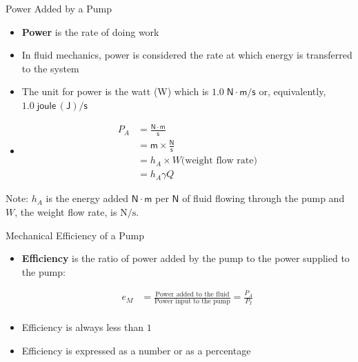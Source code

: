 \documentclass[9pt,xcolor={svgnames, x11names},professionalfonts, mathserif]{beamer}
\begin{document}

\begin{frame}{Power Added by a Pump}
	
	\begin{itemize}
		\item \textbf{Power} is the rate of doing work
		\item In fluid mechanics, power is considered the rate at which energy is transferred to the system
		\item The unit for power is the watt (W) which is $1.0\; \mathsf{N\!\cdot\! m/s}$ or, equivalently, $1.0\;
		      \mathsf{joule\,(J) /s}$
		\item[]\pause
		      
		      \begin{align*}
		      	P_A & = \mathsf{\frac{N\cdot m}{s}}          \\
		      	    & =  \mathsf{m\times \frac{N}{s}}        \\
		      	    & = h_A\times W\text{(weight flow rate)} \\
		      	    & = h_A\gamma Q                          
		      \end{align*}
	\end{itemize}
	Note: $h_A$ is the energy added $\mathsf{N\!\cdot\! m}$ per $\mathsf{N}$ of fluid flowing through the pump and
	$W$, the weight flow rate, is $\text{N/s}$.
	
\end{frame}



\begin{frame}{Mechanical Efficiency of a Pump}
	
	\begin{itemize}
		\item \textbf{Efficiency} is the ratio of power added by the pump to the power supplied to the pump:
		      
		      \begin{align*}
		      	e_M & = \frac{\text{Power added to the fluid}}{\text{Power input to the pump}}=\frac{P_A}{P_I} \\
		      \end{align*}
		      
		\item Efficiency is always less than $1$
		\item Efficiency is expressed as a number or as a percentage
	\end{itemize}
	
	
\end{frame}
\end{document}
